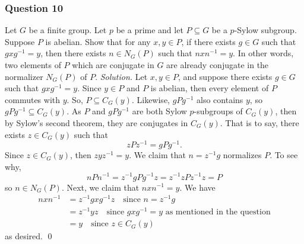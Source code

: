 \documentclass[12pt]{article}
\begin{document}
\subsubsection*{Question 10}
Let $G$ be a finite group. Let $p$ be a prime and let $P\subseteq G$ be a $p$-Sylow subgroup. Suppose $P$ is abelian. Show that for any $x,y\in P$, if there exists $g\in G$ such that $gxg^{-1}=y$, then there exists $n\in N_G(P)$ such that $nxn^{-1}=y$.
\newline
\newline In other words, two elements of $P$ which are conjugate in $G$ are already conjugate in the normalizer $N_G\left(P\right)$ of $P$.
\newline
\newline\textit{Solution.} Let $x,y\in P$, and suppose there exists $g\in G$ such that $gxg^{-1}=y$. Since $y\in P$ and $P$ is abelian, then every element of $P$ commutes with $y$. So, $P\subseteq C_G\left(y\right)$. Likewise, $gPg^{-1}$ also contains $y$, so $gPg^{-1}\subseteq C_G\left(y\right)$.
\newline
\newline As $P$ and $gPg^{-1}$ are both Sylow $p$-subgroups of $C_G\left(y\right)$, then by Sylow's second theorem, they are conjugates in $C_G\left(y\right)$. That is to say, there exists $z\in C_G\left(y\right)$ such that \[zPz^{-1}=gPg^{-1}.\]
Since $z\in C_G\left(y\right)$, then $zyz^{-1}=y$.
\newline
\newline We claim that $n=z^{-1}g$ normalizes $P$. To see why, \[nPn^{-1}=z^{-1}gPg^{-1}z=z^{-1}zPz^{-1}z=P\]
so $n\in N_G\left(P\right)$. Next, we claim that $nxn^{-1}=y$. We have \begin{align*}
    nxn^{-1}&=z^{-1}gxg^{-1}z\quad\text{since }n=z^{-1}g\\
    &=z^{-1}yz\quad\text{since }gxg^{-1}=y\text{ as mentioned in the question}\\
    &=y\quad \text{since }z\in C_G\left(y\right)
\end{align*}
as desired. \qed 
\end{document}
